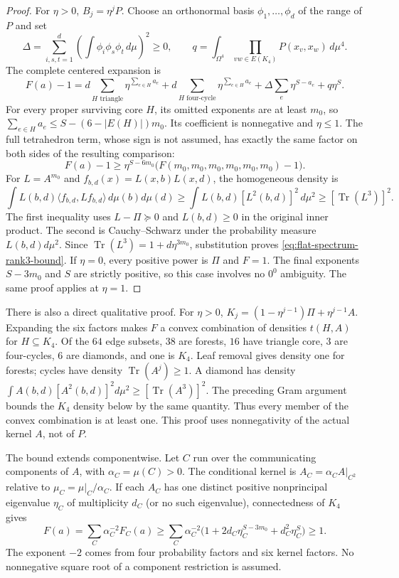 \begin{proof}
For $\eta>0$, $B_j=\eta^jP$.  Choose an orthonormal basis
$\phi_1,\ldots,\phi_d$ of the range of $P$ and set
\[
 \Delta=\sum_{i,s,t=1}^d\left(\int\phi_i\phi_s\phi_t\,d\mu\right)^2\geq0,
 \qquad q=\int_{\Omega^4}\prod_{vw\in E(K_4)}P(x_v,x_w)\,d\mu^4.
\]
The complete centered expansion is
\[
 F(a)-1=d\sum_{H\text{ triangle}}\eta^{\sum_{e\in H}a_e}
       +d\sum_{H\text{ four-cycle}}\eta^{\sum_{e\in H}a_e}
       +\Delta\sum_e\eta^{S-a_e}+q\eta^S.
\]
For every proper surviving core $H$, its omitted exponents are at least
$m_0$, so
$\sum_{e\in H}a_e\leq S-(6-|E(H)|)m_0$.
Its coefficient is nonnegative and $\eta\leq1$.  The full tetrahedron
term, whose sign is not assumed, has exactly the same factor on both sides
of the resulting comparison:
\[
 F(a)-1\geq\eta^{S-6m_0}
       \bigl(F(m_0,m_0,m_0,m_0,m_0,m_0)-1\bigr).
\]
For $L=A^{m_0}$ and $f_{b,d}(x)=L(x,b)L(x,d)$, the homogeneous density is
\[
 \int L(b,d)\langle f_{b,d},Lf_{b,d}\rangle\,d\mu(b)d\mu(d)
 \geq\int L(b,d)[L^2(b,d)]^2\,d\mu^2
 \geq[\operatorname{Tr}(L^3)]^2.
\]
The first inequality uses $L-\Pi\succeq0$ and $L(b,d)\geq0$ in the
original inner product.  The second is Cauchy--Schwarz under the probability
measure $L(b,d)d\mu^2$.  Since
$\operatorname{Tr}(L^3)=1+d\eta^{3m_0}$, substitution proves
\eqref{eq:flat-spectrum-rank3-bound}.  If $\eta=0$, every positive power
is $\Pi$ and $F=1$.  The final exponents $S-3m_0$ and $S$ are strictly
positive, so this case involves no $0^0$ ambiguity.  The same proof applies
at $\eta=1$.
\end{proof}

There is also a direct qualitative proof.  For $\eta>0$,
$K_j=(1-\eta^{j-1})\Pi+\eta^{j-1}A$.  Expanding the six factors makes
$F$ a convex combination of densities $t(H,A)$ for $H\subseteq K_4$.
Of the $64$ edge subsets, $38$ are forests, $16$ have triangle core,
$3$ are four-cycles, $6$ are diamonds, and one is $K_4$.
Leaf removal gives density one for forests; cycles have density
$\operatorname{Tr}(A^j)\geq1$.  A diamond has density
$\int A(b,d)[A^2(b,d)]^2d\mu^2\geq[\operatorname{Tr}(A^3)]^2$.
The preceding Gram argument bounds the $K_4$ density below by the same
quantity.  Thus every member of the convex combination is at least one.
This proof uses nonnegativity of the actual kernel $A$, not of $P$.

The bound extends componentwise.  Let $C$ run over the communicating
components of $A$, with $\alpha_C=\mu(C)>0$.  The conditional kernel is
$A_C=\alpha_CA|_{C^2}$ relative to $\mu_C=\mu|_C/\alpha_C$.
If each $A_C$ has one distinct positive nonprincipal eigenvalue
$\eta_C$ of multiplicity $d_C$ (or no such eigenvalue), connectedness of
$K_4$ gives
\[
 F(a)=\sum_C\alpha_C^{-2}F_C(a)
 \geq\sum_C\alpha_C^{-2}
       \bigl(1+2d_C\eta_C^{S-3m_0}+d_C^2\eta_C^S\bigr)\geq1.
\]
The exponent $-2$ comes from four probability factors and six kernel
factors.  No nonnegative square root of a component restriction is assumed.

